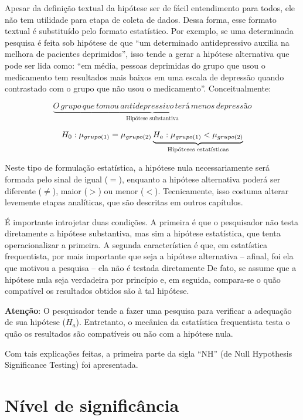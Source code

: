 \documentclass[
]{book}
\begin{document}
Apesar da definição textual da hipótese ser de fácil entendimento para
todos, ele não tem utilidade para etapa de coleta de dados. Dessa forma,
esse formato textual é substituído pelo formato estatístico. Por
exemplo, se uma determinada pesquisa é feita sob hipótese de que ``um
determinado antidepressivo auxilia na melhora de pacientes deprimidos'',
isso tende a gerar a hipótese alternativa que pode ser lida como: ``em
média, pessoas deprimidas do grupo que usou o medicamento tem resultados
mais baixos em uma escala de depressão quando contrastado com o grupo
que não usou o medicamento''. Conceitualmente:

\[\underbrace{O \,grupo \,que \,tomou \,antidepressivo \,terá \,menos \,depressão}_\text{Hipótese  substantiva}\]

\[H_0: \mu_{grupo (1)} = \mu_{grupo (2)} \\ \underbrace{H_a: \mu_{grupo (1)} < \mu_{grupo (2)}}_\text{Hipóteses estatísticas}\]

Neste tipo de formulação estatística, a hipótese nula necessariamente
será formada pelo sinal de igual (\(=\)), enquanto a hipótese
alternativa poderá ser diferente (\(\neq\)), maior (\(>\)) ou menor
(\(<\)). Tecnicamente, isso costuma alterar levemente etapas analíticas,
que são descritas em outros capítulos.

É importante introjetar duas condições. A primeira é que o pesquisador
não testa diretamente a hipótese substantiva, mas sim a hipótese
estatística, que tenta operacionalizar a primeira. A segunda
característica é que, em estatística frequentista, por mais importante
que seja a hipótese alternativa -- afinal, foi ela que motivou a
pesquisa -- ela não é testada diretamente De fato, se assume que a
hipótese nula seja verdadeira por princípio e, em seguida, compara-se o
quão compatível os resultados obtidos são à tal hipótese.

\begin{warning}

\textbf{Atenção}: O pesquisador tende a fazer uma pesquisa para
verificar a adequação de sua hipótese (\(H_a\)). Entretanto, o mecânica
da estatística frequentista testa o quão os resultados são compatíveis
ou não com a hipótese nula.

\end{warning}

Com tais explicações feitas, a primeira parte da sigla ``NH'' (de Null
Hypothesis Significance Testing) foi apresentada.

\hypertarget{nuxedvel-de-significuxe2ncia}{%
\section{Nível de significância}\label{nuxedvel-de-significuxe2ncia}}
\end{document}
